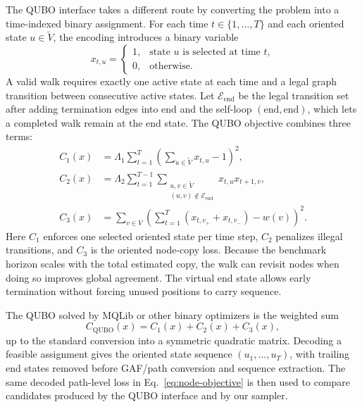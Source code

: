 \documentclass[11pt]{article}
\newcommand{\Vori}{\widetilde V}
\newcommand{\Vend}{\mathrm{end}}
\begin{document}
The QUBO interface takes a different route by converting the problem into a time-indexed binary assignment. For each time $t\in\{1,\ldots,T\}$ and each oriented state $u\in\Vori$, the encoding introduces a binary variable
\begin{equation}
x_{t,u}=
\begin{cases}
1, & \text{state }u\text{ is selected at time }t,\\
0, & \text{otherwise}.
\end{cases}
\end{equation}
A valid walk requires exactly one active state at each time and a legal graph transition between consecutive active states. Let $\mathcal E_{\mathrm{end}}$ be the legal transition set after adding termination edges into $\Vend$ and the self-loop $(\Vend,\Vend)$, which lets a completed walk remain at the end state. The QUBO objective combines three terms:
\begin{align}
C_1(x)
&=
\Lambda_1\sum_{t=1}^{T}
\left(\sum_{u\in\Vori}x_{t,u}-1\right)^2,
\label{eq:qubo-one-state}\\
C_2(x)
&=
\Lambda_2\sum_{t=1}^{T-1}
\sum_{\substack{u,v\in\Vori\\(u,v)\notin\mathcal E_{\mathrm{end}}}}
x_{t,u}x_{t+1,v},
\label{eq:qubo-transition}\\
C_3(x)
&=
\sum_{v\in V}
\left(\sum_{t=1}^{T}(x_{t,v_+}+x_{t,v_-})-w(v)\right)^2.
\label{eq:qubo-copy}
\end{align}
Here $C_1$ enforces one selected oriented state per time step, $C_2$ penalizes illegal transitions, and $C_3$ is the oriented node-copy loss. Because the benchmark horizon scales with the total estimated copy, the walk can revisit nodes when doing so improves global agreement. The virtual end state allows early termination without forcing unused positions to carry sequence.

The QUBO solved by MQLib or other binary optimizers \citep{dunning2018mqlib} is the weighted sum
\begin{equation}
C_{\mathrm{QUBO}}(x)=C_1(x)+C_2(x)+C_3(x),
\label{eq:qubo-total}
\end{equation}
up to the standard conversion into a symmetric quadratic matrix. Decoding a feasible assignment gives the oriented state sequence $(u_1,\ldots,u_T)$, with trailing end states removed before GAF/path conversion and sequence extraction. The same decoded path-level loss in Eq.~\eqref{eq:node-objective} is then used to compare candidates produced by the QUBO interface and by our sampler.
\end{document}
